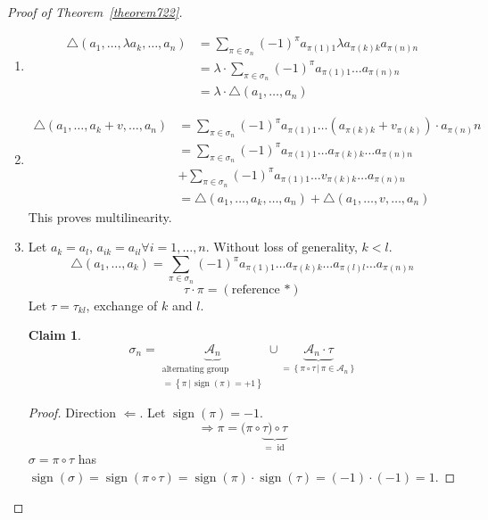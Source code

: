 \documentclass{article}
\newtheorem*{claim}{Claim}%
\newcommand{\setdef}[2]{\left\{\left.#1\,\right|\,#2\right\}}
\DeclareMathOperator{\sign}{sign}
\begin{document}
\begin{proof}[Proof of Theorem~\ref{theorem722}]
  \begin{enumerate}
    \item
      \begin{align*}
        \triangle(a_1, \dots, \lambda a_k, \dots, a_n)
          &= \sum_{\pi \in \sigma_n} (-1)^{\pi} a_{\pi(1)1} \lambda a_{\pi(k) k} a_{\pi(n) n} \\
          &= \lambda \cdot \sum_{\pi \in \sigma_n} (-1)^\pi a_{\pi(1) 1} \dots a_{\pi(n) n} \\
          &= \lambda \cdot \triangle(a_1, \dots, a_n)
      \end{align*}
    \item
      \begin{align*}
        \triangle(a_1, \dots, a_k + v, \dots, a_n)
          &= \sum_{\pi \in \sigma_n} (-1)^\pi a_{\pi(1) 1} \dots (a_{\pi(k) k} + v_{\pi(k)}) \cdot a_{\pi(n)} n \\
          &= \sum_{\pi \in \sigma_n} (-1)^\pi a_{\pi(1) 1} \dots a_{\pi(k) k} \dots a_{\pi(n) n} \\
    &+ \sum_{\pi \in \sigma_n} (-1)^\pi a_{\pi(1) 1} \dots v_{\pi(k) k} \dots a_{\pi(n) n} \\
          &= \triangle(a_1, \dots, a_k, \dots, a_n) + \triangle(a_1, \dots, v, \dots, a_n)
      \end{align*}
      This proves multilinearity.
    \item
      Let $a_k = a_l$, $a_{ik} = a_{il} \forall i = 1, \dots, n$.
      Without loss of generality, $k < l$.
      \[ \triangle(a_1, \dots, a_k) = \sum_{\pi \in \sigma_n} (-1)^\pi a_{\pi(1) 1} \dots a_{\pi(k) k} \dots a_{\pi(l) l} \dots a_{\pi(n) n} \]
      \[ \tau \cdot \pi = (\text{reference *}) \]
      Let $\tau = \tau_{kl}$, exchange of $k$ and $l$.
      \begin{claim}
        \[ \sigma_n = \underbrace{\mathcal A_n}_{\substack{\text{alternating group} \\ = \setdef{\pi}{\sign(\pi) = +1}}} \cup \underbrace{\mathcal A_{n} \cdot \tau}_{= \setdef{\pi \circ \tau}{\pi \in \mathcal A_n}} \]
      \end{claim}
      \begin{proof}
        Direction $\Leftarrow$.
        Let $\sign(\pi) = -1$.
        \[ \Rightarrow \pi = (\pi \circ \underbrace{\tau) \circ \tau}_{= \operatorname{id}} \]
        $\sigma = \pi \circ \tau$ has $\sign(\sigma) = \sign(\pi \circ \tau) = \sign(\pi) \cdot \sign(\tau) = (-1) \cdot (-1) = 1$.

\end{proof}
\end{enumerate}
\end{proof}
\end{document}
